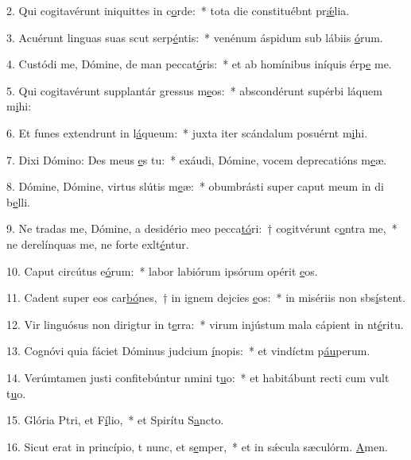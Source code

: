 2. Qui cogitavérunt iniquittes in c\uline{o}rde:~* tota die constituébnt pr\uline{ǽ}lia.\par 
3. Acuérunt linguas suas scut serp\uline{é}ntis:~* venénum áspidum sub lábiis \uline{ó}rum.\par 
4. Custódi me, Dómine, de man peccat\uline{ó}ris:~* et ab homínibus iníquis érp\uline{e} me.\par 
5. Qui cogitavérunt supplantár gressus m\uline{e}os:~* abscondérunt supérbi láquem m\uline{i}hi:\par 
6. Et funes extendrunt in l\uline{á}queum:~* juxta iter scándalum posuérnt m\uline{i}hi.\par 
7. Dixi Dómino: Des meus \uline{e}s tu:~* exáudi, Dómine, vocem deprecatións m\uline{e}æ.\par 
8. Dómine, Dómine, virtus slútis m\uline{e}æ:~* obumbrásti super caput meum in di b\uline{e}lli.\par 
9. Ne tradas me, Dómine, a desidério meo pecca\uline{tó}ri:~† cogitvérunt c\uline{o}ntra me,~* ne derelínquas me, ne forte exlt\uline{é}ntur.\par 
10. Caput circútus e\uline{ó}rum:~* labor labiórum ipsórum opérit \uline{e}os.\par 
11. Cadent super eos car\uline{bó}nes,~† in ignem dejcies \uline{e}os:~* in misériis non sbs\uline{í}stent.\par 
12. Vir linguósus non dirigtur in t\uline{e}rra:~* virum injústum mala cápient in nt\uline{é}ritu.\par 
13. Cognóvi quia fáciet Dóminus judcium \uline{í}nopis:~* et vindíctm p\uline{áu}perum.\par 
14. Verúmtamen justi confitebúntur nmini t\uline{u}o:~* et habitábunt recti cum vult t\uline{u}o.\par 
15. Glória Ptri, et F\uline{í}lio,~* et Spirítu S\uline{a}ncto.\par 
16. Sicut erat in princípio, t nunc, et s\uline{e}mper,~* et in sǽcula sæculórm. \uline{A}men.\par 
